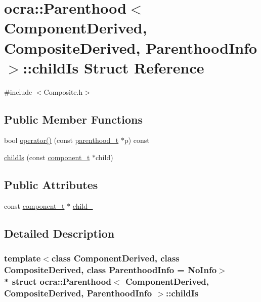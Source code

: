 \hypertarget{structocra_1_1Parenthood_1_1childIs}{}\section{ocra\+:\+:Parenthood$<$ Component\+Derived, Composite\+Derived, Parenthood\+Info $>$\+:\+:child\+Is Struct Reference}
\label{structocra_1_1Parenthood_1_1childIs}


{\ttfamily \#include $<$Composite.\+h$>$}

\subsection*{Public Member Functions}
\begin{DoxyCompactItemize}
\item 
bool \hyperlink{structocra_1_1Parenthood_1_1childIs_a0e965b6137ad515141f9fde4fb435f2f}{operator()} (const \hyperlink{classocra_1_1Parenthood_acdae20cb747190b5dc9dbe42290bde78}{parenthood\+\_\+t} $\ast$p) const 
\item 
\hyperlink{structocra_1_1Parenthood_1_1childIs_a19d608fdf341bf6e8c98578a5d2e5221}{child\+Is} (const \hyperlink{classocra_1_1Parenthood_a44b601577125fe0fd1d1e5ae4f143349}{component\+\_\+t} $\ast$child)
\end{DoxyCompactItemize}
\subsection*{Public Attributes}
\begin{DoxyCompactItemize}
\item 
const \hyperlink{classocra_1_1Parenthood_a44b601577125fe0fd1d1e5ae4f143349}{component\+\_\+t} $\ast$ \hyperlink{structocra_1_1Parenthood_1_1childIs_a6e3329ea395bbb40d41caceecb1587b7}{child\+\_\+}
\end{DoxyCompactItemize}


\subsection{Detailed Description}
\subsubsection*{template$<$class Component\+Derived, class Composite\+Derived, class Parenthood\+Info = No\+Info$>$\\*
struct ocra\+::\+Parenthood$<$ Component\+Derived, Composite\+Derived, Parenthood\+Info $>$\+::child\+Is}



